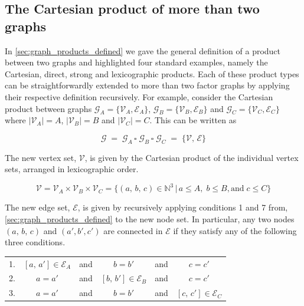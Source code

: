 \label{sec:dd_gsp}

\subsection{The Cartesian product of more than two graphs}

In \cref{sec:graph_products_defined} we gave the general definition of a product between two graphs and highlighted four standard examples, namely the Cartesian, direct, strong and lexicographic products. Each of these product types can be straightforwardly extended to more than two factor graphs by applying their respective definition recursively. For example, consider the Cartesian product between graphs $\mathcal{G}_A = \{\mathcal{V}_A, \mathcal{E}_A\}$, $\mathcal{G}_B = \{\mathcal{V}_B, \mathcal{E}_B\}$ and $\mathcal{G}_C = \{\mathcal{V}_C, \mathcal{E}_C\}$ where $|\mathcal{V}_A| = A$, $|\mathcal{V}_B| = B$ and $|\mathcal{V}_C| = C$. This can be written as 

\begin{equation}
    \mathcal{G} \; = \; \mathcal{G}_A \, \square \; \mathcal{G}_B \, \square \; \mathcal{G}_C \; = \; \{\mathcal{V}, \, \mathcal{E}\}
\end{equation}

The new vertex set, $\mathcal{V}$, is given by the Cartesian product of the individual vertex sets, arranged in lexicographic order. 

\begin{equation}
    \mathcal{V} = \mathcal{V}_A \times \mathcal{V}_B \times \mathcal{V}_C = \{(a, \, b, \, c) \in \mathbb{N}^3 \, | \, a \leq A, \; b \leq B, \text{and} \;  c \leq C\}
\end{equation}

The new edge set, $\mathcal{E}$, is given by recursively applying conditions 1 and 7 from, \cref{sec:graph_products_defined} to the new node set. In particular, any two nodes $(a, \, b, \, c)$ and $(a', b', c')$ are connected in $\mathcal{E}$ if they satisfy any of the following three conditions. 

\vspace{0.5cm}

\begin{table}[h]
    \def\arraystretch{1.5}
    \centering
    \begin{tabular}{lclclc}
        1. & $[a, \, a'] \in \mathcal{E}_A$    & and & $b = b'$  & and & $c = c'$             \\
        2. & $a = a'$    & and & $[b, \, b'] \in \mathcal{E}_B$   & and & $c = c'$             \\
        3. & $a = a'$    & and & $b = b'$  & and & $[c, \, c'] \in \mathcal{E}_C$              \\
    \end{tabular}
\end{table}


